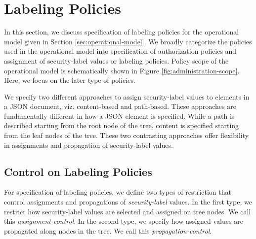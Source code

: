 \newcommand{\assignmentControl}{\textit{assignment-control}}
\newcommand{\propagationControl}{\textit{propagation-control}}
\section{Labeling Policies}
\label{sec:administrative-model}
 


 
 In this section, we discuss specification of labeling policies for the operational model given in Section \ref{sec:operational-model}. We broadly categorize the policies used in the operational model into specification of authorization policies and assignment of security-label values or labeling policies. Policy scope of the operational model is schematically shown in Figure \ref{fig:administration-scope}. Here, we focus on the later type of policies.
 
  
 
 We specify two different approaches to assign security-label values to elements in a JSON document, viz. content-based and  path-based. These approaches are fundamentally different in how a JSON element is specified. While a path is described starting from the root node of the tree, content is specified starting from the leaf nodes of the tree. These two contrasting approaches offer flexibility in assignments and propagation of security-label values.
 
 
 \subsection{Control on Labeling Policies}
 
 

For specification of labeling policies, we define two types of restriction that control assignments and propagations of \textit{security-label} values. In the first type, we restrict how security-label values are selected and assigned on tree nodes. We call this \assignmentControl{}. In the second type, we specify how assigned values are propagated along nodes in the tree. We call this \propagationControl{}. 
 
